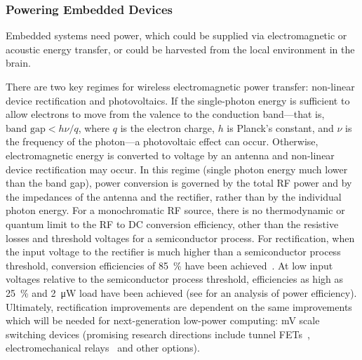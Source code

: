 \subsubsection{Powering Embedded Devices}

Embedded systems need power, which could be supplied via electromagnetic or acoustic energy transfer, or could be harvested from the local environment in the brain.

There are two key regimes for wireless electromagnetic power transfer: non-linear device rectification and photovoltaics.
If the single-photon energy is sufficient to allow electrons to move from the valence to the conduction band---that is, $\text{band gap} < h\nu/q$, where $q$ is the electron charge, $h$ is Planck's constant, and $\nu$ is the frequency of the photon---a photovoltaic effect can occur.
Otherwise, electromagnetic energy is converted to voltage by an antenna and non-linear device rectification may occur.
In this regime (single photon energy much lower than the band gap), power conversion is governed by the total RF power and by the impedances of the antenna and the rectifier, rather than by the individual photon energy.
For a monochromatic RF source, there is no thermodynamic or quantum limit to the RF to DC conversion efficiency, other than the resistive losses and threshold voltages for a semiconductor process.
For rectification, when the input voltage to the rectifier is much higher than a semiconductor process threshold, conversion efficiencies of \SI{85}{\percent} have been achieved~\cite{sun02}.
At low input voltages relative to the semiconductor process threshold, efficiencies as high as \SI{25}{\percent} and \SI{2}{\micro\watt} load have been achieved (see \cite{mandal07} for an analysis of power efficiency).
Ultimately, rectification improvements are dependent on the same improvements which will be needed for next-generation low-power computing: \si{\milli\volt} scale switching devices (promising research directions include tunnel FETs~\cite{ionescu11}, electromechanical relays~\cite{liu12} and other options). 

